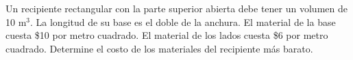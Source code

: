 \item Un recipiente rectangular con la parte superior abierta debe tener un volumen de 10 m$^3$. La longitud de su base es el doble de la anchura. El material de la base cuesta \$10 por metro cuadrado. El material de los lados cuesta \$6 por metro cuadrado. Determine el costo de los materiales del recipiente más barato.
